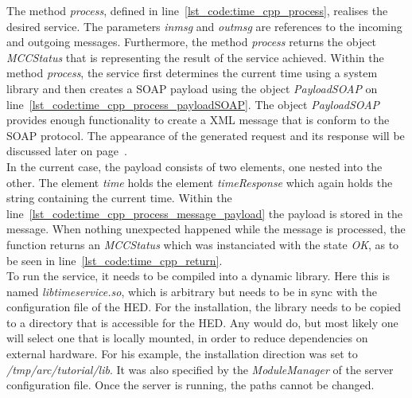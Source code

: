The method \textit{process}, defined in line~\ref{lst_code:time_cpp_process}, realises the desired service. 
The parameters \textit{inmsg} and \textit{outmsg} are references to the incoming and outgoing messages.
Furthermore, the method \textit{process} returns the object \textit{MCCStatus} that is representing the result of the service achieved. 
Within the method \textit{process}, the service first determines the current time using a system library and then creates a SOAP payload using the object \textit{PayloadSOAP} on line~\ref{lst_code:time_cpp_process_payloadSOAP}. 
The object \textit{PayloadSOAP} provides enough functionality to create a XML message that is conform to the SOAP protocol.
The appearance of the generated request and its response will be discussed later on page~\pageref{lst:time_client_request}.\\


In the current case, the payload consists of two elements, one nested into the other.
The element \textit{time} holds the element \textit{timeResponse} which again holds the string containing the current time.
Within the line~\ref{lst_code:time_cpp_process_message_payload} the payload is stored in the message. 
When nothing unexpected happened while the message is processed, the function returns an \textit{MCCStatus} which was instanciated with the state \textit{OK}, as to be seen in line~\ref{lst_code:time_cpp_return}.\\



To run the service, it needs to be compiled into a dynamic library. Here this is named \textit{libtimeservice.so}, which is arbitrary but needs to be in sync with the configuration file of the HED.
For the installation, the library needs to be copied to a directory that is accessible for the HED. Any would do, but most likely one will select one that is locally mounted, in order to reduce dependencies on external hardware. For his example, the installation direction was set to \textit{/tmp/arc/tutorial/lib}. It was also specified by the \textit{ModuleManager} of the server configuration file. 
Once the server is running, the paths cannot be changed.\\


